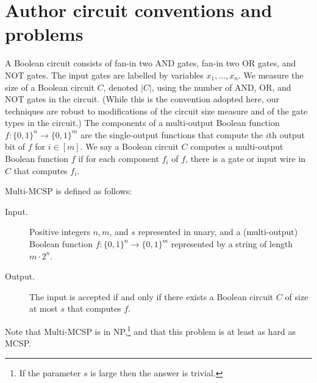 \section*{Author circuit conventions and problems}
A Boolean circuit consists of fan-in two AND gates, fan-in two OR gates, and NOT gates. The input gates are labelled by variables $x_1,\ldots,x_n$. We measure the size of a Boolean circuit $C$, denoted $|C|$, using the number of AND, OR, and NOT gates in the circuit. (While this is the convention adopted here, our techniques are robust to modifications of the circuit size measure and of the gate types in the circuit.)
The components of a multi-output Boolean function $f:\{0,1\}^n\to\{0,1\}^m$ are the single-output functions that compute the $i$th output bit of $f$ for $i\in[m]$. We say a Boolean circuit $C$ computes a multi-output Boolean function $f$ if for each component $f_i$ of $f$, there is a gate or input wire in $C$ that computes $f_i$.
\setcounter{nttheorem}{0}
\begin{ntdefinition}
Multi-MCSP is defined as follows:
\begin{description}
\item[Input.] Positive integers $n,m$, and $s$ represented in unary, and a (multi-output) Boolean function $f:\{0,1\}^n\to\{0,1\}^m$ represented by a string of length $m\cdot2^n$.
\item[Output.] The input is accepted if and only if there exists a Boolean circuit $C$ of size at most $s$ that computes $f$.
\end{description}
\end{ntdefinition}
Note that Multi-MCSP is in NP,\footnote{If the parameter $s$ is large then the answer is trivial.} and that this problem is at least as hard as MCSP.
